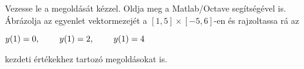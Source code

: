 Vezesse le a 
\de{} megoldását kézzel. 
Oldja meg a Matlab/Octave   segítségével is. 
Ábrázolja az egyenlet vektormezejét a $[1,5]\times [-5,6]$-en és rajzoltassa rá 
az 
\centerline{$y(1)=0, \hspace{0.8cm} y(1)=2, \hspace{0.8cm} y(1)=4$} 
kezdeti értékekhez tartozó megoldásokat is.


